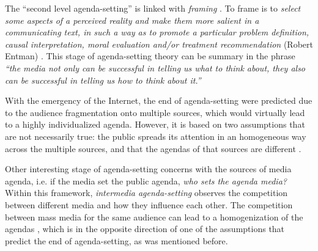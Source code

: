 \documentclass[a4paper, 12pt]{article}
\begin{document}
\par The ``second level agenda-setting'' is linked with \textit{framing} \cite{guggenheim2015dynamics} \cite{tsur2015frame}. 
To frame is to \textit{select some aspects of a perceived reality and make them more salient in a communicating text, in such a way as to promote a particular problem definition, causal interpretation, moral evaluation and/or treatment recommendation} (Robert Entman) \cite{mccombs2005look}.
This stage of agenda-setting theory can be summary in the phrase \textit{``the media not only can be successful in telling us what to think about, they also can be successful in telling us how to think about it.''} 

\par With the emergency of the Internet, the end of agenda-setting were predicted due to the audience fragmentation onto multiple sources, which would virtually lead to a highly individualized agenda. However, it is based on two assumptions that are not necessarily true: the public spreads its attention in an homogeneous way across the multiple sources, and that the agendas of that sources are different \cite{mccombs2005look}.

\par Other interesting stage of agenda-setting concerns with the sources of media agenda, i.e. if the media set the public agenda, \textit{who sets the agenda media?} Within this framework, \textit{intermedia agenda-setting} observes the competition between different media and how they influence each other. The competition between mass media for the same audience can lead to a homogenization of the agendas \cite{vargo2017networks}, which is in the opposite direction of one of the assumptions that predict the end of agenda-setting, as was mentioned before.


\end{document}
